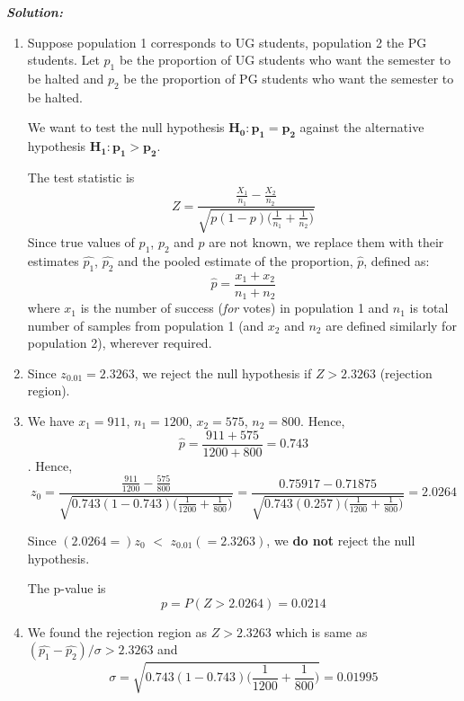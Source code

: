\documentclass[12pt, oneside]{article}
\begin{document}
\begin{enumerate}
\textit{\textbf{Solution:}} \\
\begin{enumerate}
    \item  Suppose population 1 corresponds to UG students, population 2 the PG students. Let $p_1$ be the proportion of UG students who 
    want the semester to be halted and $p_2$ be the proportion of PG students who want the semester to be halted.
    
    We want to test the null hypothesis $\mathbf{H_0: p_1=p_2 }$ against the alternative hypothesis $\mathbf{H_1: p_1>p_2}$.
    
    The test statistic is 
    \[  Z = \dfrac{\frac{X_1}{n_1} - \frac{X_2}{n_2}} {\sqrt{p(1-p)\big(\frac{1}{n_1} + \frac{1}{n_2}\big) }} \]
    Since true values of $p_1$, $p_2$ and $p$ are not known, we replace them with their estimates $\hat{p_1}$, $\hat{p_2}$ and the pooled estimate of the proportion, $\hat p$, defined as: 
    \[ \hat p = \frac{x_1 + x_2}{n_1 + n_2} \]
    where $x_1$ is the number of success (\textit{for} votes) in population 1 and $n_1$ is total number of samples from population 1 (and $x_2$ and $n_2$ are defined similarly for population 2), wherever required.
    
    \item 
    
    Since $z_{0.01} = 2.3263$, we reject the null hypothesis if $Z > 2.3263$ (rejection region).
    
    \item 
    We have $x_1 = 911$, $n_1 = 1200$, $x_2 = 575$, $n_2 = 800$. Hence, 
    \[ \hat p = \frac{911 + 575}{1200 + 800} = 0.743 \].
    Hence, 
    \[  z_0 = \dfrac{\frac{911}{1200} - \frac{575}{800}} {\sqrt{0.743(1-0.743)\big(\frac{1}{1200} + \frac{1}{800}\big) }} =  \dfrac{ 0.75917 - 0.71875 } {\sqrt{0.743(0.257)\big(\frac{1}{1200} + \frac{1}{800}\big) }} = 2.0264\]
    
    Since $(2.0264 =) z_0$ $<$ $z_{0.01} (= 2.3263)$, we \textbf{do not} reject the null hypothesis.
    
    
    The p-value is
    \[ p = P(Z > 2.0264) = 0.0214 \]
    
    \item 
    We found the rejection region as $Z > 2.3263$ which is same as $( \hat{p_1} - \hat{p_2} )/\sigma > 2.3263$ and 
    \[ \sigma = \sqrt{0.743(1-0.743)\big(\frac{1}{1200} + \frac{1}{800}\big) } = 0.01995 \]
    

\end{enumerate}
\end{enumerate}
\end{document}
